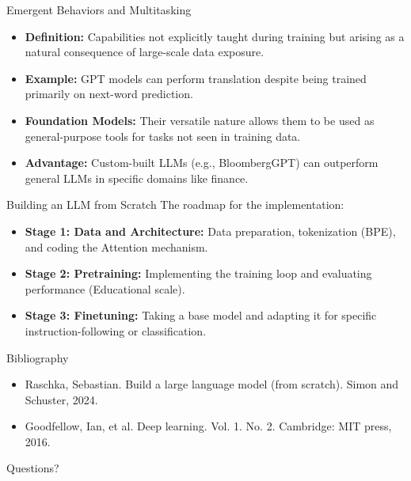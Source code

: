 \documentclass[aspectratio=169]{beamer}
\begin{document}
\begin{frame}{Emergent Behaviors and Multitasking}
    \begin{itemize}
        \item \textbf{Definition:} Capabilities not explicitly taught during training but arising as a natural consequence of large-scale data exposure.
        \item \textbf{Example:} GPT models can perform translation despite being trained primarily on next-word prediction.
        \item \textbf{Foundation Models:} Their versatile nature allows them to be used as general-purpose tools for tasks not seen in training data.
        \item \textbf{Advantage:} Custom-built LLMs (e.g., BloombergGPT) can outperform general LLMs in specific domains like finance.
    \end{itemize}
\end{frame}



\begin{frame}{Building an LLM from Scratch}
    The roadmap for the implementation:
    \begin{itemize}
        \item \textbf{Stage 1: Data and Architecture:} Data preparation, tokenization (BPE), and coding the Attention mechanism.
        \item \textbf{Stage 2: Pretraining:} Implementing the training loop and evaluating performance (Educational scale).
        \item \textbf{Stage 3: Finetuning:} Taking a base model and adapting it for specific instruction-following or classification.
    \end{itemize}
\end{frame}


\begin{frame}{Bibliography}
	\begin{itemize}
		\item Raschka, Sebastian. Build a large language model (from scratch). Simon and Schuster, 2024.
		\item Goodfellow, Ian, et al. Deep learning. Vol. 1. No. 2. Cambridge: MIT press, 2016.
	\end{itemize}
\end{frame}

\begin{frame}[standout]
    Questions?
\end{frame}
\end{document}

